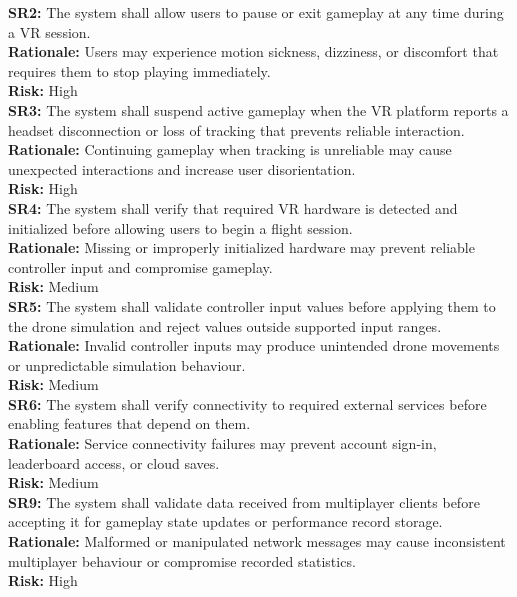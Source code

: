 \documentclass{article}
\newcommand{\reqdef}[1]{\textbf{#1:}}
\begin{document}
\noindent
\reqdef{SR2} The system shall allow users to pause or exit gameplay at any time during a VR session.\\
\textbf{Rationale:} Users may experience motion sickness, dizziness, or discomfort that requires them to stop playing immediately.\\
\textbf{Risk:} High\\[1em]

\noindent
\reqdef{SR3} The system shall suspend active gameplay when the VR platform reports a headset disconnection or loss of tracking that prevents reliable interaction.\\
\textbf{Rationale:} Continuing gameplay when tracking is unreliable may cause unexpected interactions and increase user disorientation.\\
\textbf{Risk:} High\\[1em]

\noindent
\reqdef{SR4} The system shall verify that required VR hardware is detected and initialized before allowing users to begin a flight session.\\
\textbf{Rationale:} Missing or improperly initialized hardware may prevent reliable controller input and compromise gameplay.\\
\textbf{Risk:} Medium\\[1em]

\noindent
\reqdef{SR5} The system shall validate controller input values before applying them to the drone simulation and reject values outside supported input ranges.\\
\textbf{Rationale:} Invalid controller inputs may produce unintended drone movements or unpredictable simulation behaviour.\\
\textbf{Risk:} Medium\\[1em]

\noindent
\reqdef{SR6} The system shall verify connectivity to required external services before enabling features that depend on them.\\
\textbf{Rationale:} Service connectivity failures may prevent account sign-in, leaderboard access, or cloud saves.\\
\textbf{Risk:} Medium\\[1em]

\noindent
\reqdef{SR9} The system shall validate data received from multiplayer clients before accepting it for gameplay state updates or performance record storage.\\
\textbf{Rationale:} Malformed or manipulated network messages may cause inconsistent multiplayer behaviour or compromise recorded statistics.\\
\textbf{Risk:} High\\[1em]
\end{document}
